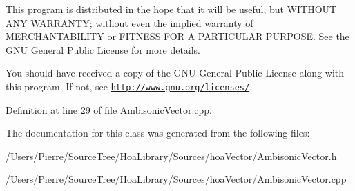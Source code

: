 This program is distributed in the hope that it will be useful, but W\-I\-T\-H\-O\-U\-T A\-N\-Y W\-A\-R\-R\-A\-N\-T\-Y; without even the implied warranty of M\-E\-R\-C\-H\-A\-N\-T\-A\-B\-I\-L\-I\-T\-Y or F\-I\-T\-N\-E\-S\-S F\-O\-R A P\-A\-R\-T\-I\-C\-U\-L\-A\-R P\-U\-R\-P\-O\-S\-E. See the G\-N\-U General Public License for more details.

You should have received a copy of the G\-N\-U General Public License along with this program. If not, see \href{http://www.gnu.org/licenses/}{\tt http\-://www.\-gnu.\-org/licenses/}. 

Definition at line 29 of file Ambisonic\-Vector.\-cpp.



The documentation for this class was generated from the following files\-:\begin{DoxyCompactItemize}
\item 
/\-Users/\-Pierre/\-Source\-Tree/\-Hoa\-Library/\-Sources/hoa\-Vector/Ambisonic\-Vector.\-h\item 
/\-Users/\-Pierre/\-Source\-Tree/\-Hoa\-Library/\-Sources/hoa\-Vector/Ambisonic\-Vector.\-cpp\end{DoxyCompactItemize}
